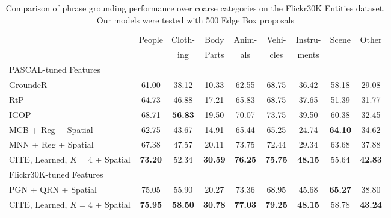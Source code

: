 \documentclass[runningheads]{llncs}
\begin{document}
\smallskip\begin{table*}[t]
\centering
  \caption{Comparison of phrase grounding performance over coarse categories on the Flickr30K Entities dataset.  Our models were tested with 500 Edge Box proposals}
    \label{tab:type_results}
  \setlength{\tabcolsep}{1pt}
    \begin{tabular}{|l|c|c|c|c|c|c|c|c|}
      \hline
     & \multirow{2}{*}{People} & Cloth- & Body & Anim- & Vehi- & Instru- & \multirow{2}{*}{Scene} & \multirow{2}{*}{Other} \\
     & & ing & Parts & als & cles & ments &  &  \\
      \hline
      \hline
      \multicolumn{9}{|l|}{PASCAL-tuned Features} \\
        \hline
     GroundeR~\cite{rohrbach2015} & 61.00 & 38.12 & 10.33 & 62.55 & 68.75 & 36.42 & 58.18 & 29.08 \\
     RtP~\cite{flickrentitiesijcv} & 64.73 & 46.88 & 17.21 & 65.83 & 68.75 & 37.65 & 51.39 & 31.77 \\
      IGOP~\cite{yehNIPS2017} & 68.71 & {\bf 56.83} & 19.50 & 70.07 & 73.75 & 39.50 & 60.38 & 32.45\\
      MCB + Reg + Spatial~\cite{ChenICMR2017} & 62.75 & 43.67 & 14.91 & 65.44 & 65.25 & 24.74 & {\bf 64.10} & 34.62\\
      MNN + Reg + Spatial~\cite{ChenICMR2017} & 67.38 & 47.57 & 20.11 & 73.75 & 72.44 & 29.34 & 63.68 & 37.88\\
     CITE, Learned, $K=4$ + Spatial & {\bf 73.20} & 52.34 & {\bf 30.59} & {\bf 76.25} & {\bf 75.75} & {\bf 48.15} & 55.64 & {\bf 42.83}\\
      \hline
  \multicolumn{9}{|l|}{Flickr30K-tuned Features} \\
  \hline
  PGN + QRN + Spatial~\cite{ChenICCV2017} & 75.05 & 55.90 & 20.27 & 73.36 & 68.95 & 45.68 & {\bf 65.27} & 38.80\\
   CITE, Learned, $K=4$ + Spatial& {\bf 75.95} & {\bf 58.50} & {\bf 30.78} & {\bf 77.03} & {\bf 79.25} & {\bf 48.15} & 58.78 & {\bf 43.24}\\
      \hline
    \end{tabular}

\end{table*}
\end{document}
